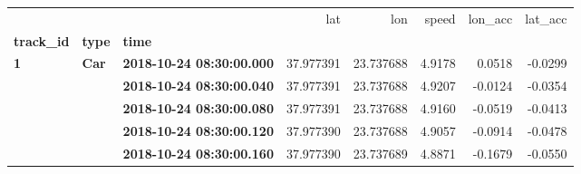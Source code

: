 \begin{tabular}{lllrrrrr}
\toprule
  &     &                         &        lat &        lon &   speed &  lon\_acc &  lat\_acc \\
\textbf{track\_id} & \textbf{type} & \textbf{time} &            &            &         &          &          \\
\midrule
\textbf{1} & \textbf{Car} & \textbf{2018-10-24 08:30:00.000} &  37.977391 &  23.737688 &  4.9178 &   0.0518 &  -0.0299 \\
  &     & \textbf{2018-10-24 08:30:00.040} &  37.977391 &  23.737688 &  4.9207 &  -0.0124 &  -0.0354 \\
  &     & \textbf{2018-10-24 08:30:00.080} &  37.977391 &  23.737688 &  4.9160 &  -0.0519 &  -0.0413 \\
  &     & \textbf{2018-10-24 08:30:00.120} &  37.977390 &  23.737688 &  4.9057 &  -0.0914 &  -0.0478 \\
  &     & \textbf{2018-10-24 08:30:00.160} &  37.977390 &  23.737689 &  4.8871 &  -0.1679 &  -0.0550 \\
\bottomrule
\end{tabular}
